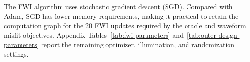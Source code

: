 The FWI algorithm uses stochastic gradient descent (SGD). Compared with Adam,
SGD has lower memory requirements, making it practical to retain the computation
graph for the 20 FWI updates required by the oracle and waveform misfit objectives. Appendix Tables~\ref{tab:fwi-parameters}
and~\ref{tab:outer-design-parameters} report the remaining optimizer,
illumination, and randomization settings.


